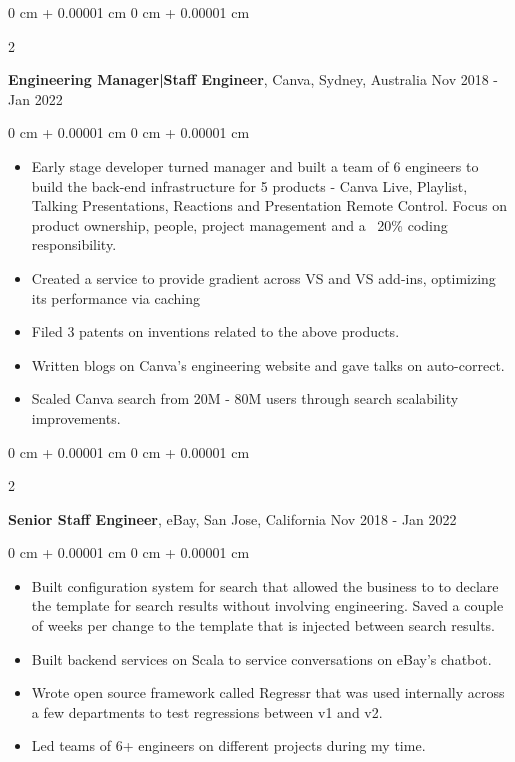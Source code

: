 \documentclass[10pt, letterpaper]{article}
\newenvironment{highlights}{
    \begin{itemize}[
        topsep=0.10 cm,
        parsep=0.10 cm,
        partopsep=0pt,
        itemsep=0pt,
        leftmargin=0 cm + 10pt
    ]
}{
    \end{itemize}
} %
\newenvironment{onecolentry}{
    \begin{adjustwidth}{
        0 cm + 0.00001 cm
    }{
        0 cm + 0.00001 cm
    }
}{
    \end{adjustwidth}
} %
\newenvironment{twocolentry}[2][]{
    \onecolentry
    \def\secondColumn{#2}
    \setcolumnwidth{\fill, 4.5 cm}
    \begin{paracol}{2}
}{
    \switchcolumn \raggedleft \secondColumn
    \end{paracol}
    \endonecolentry
} %
\begin{document}
        \vspace{0.15 cm}

        \begin{twocolentry}{
            Nov 2018 - Jan 2022
        }
            \textbf{Engineering Manager|Staff Engineer}, Canva, Sydney, Australia\end{twocolentry}

        \vspace{0.10 cm}
        \begin{onecolentry}
            \begin{highlights}
                \item Early stage developer turned manager and built a team of 6 engineers to build the back-end infrastructure for 5 products - Canva Live, Playlist, Talking Presentations, Reactions and Presentation Remote Control. Focus on product ownership, people, project management and a ~20\% coding responsibility.
                \item Created a service to provide gradient across VS and VS add-ins, optimizing its performance via caching
                \item Filed 3 patents on inventions related to the above products.
                \item Written blogs on Canva's engineering website and gave talks on auto-correct.
                \item Scaled Canva search from 20M - 80M users through search scalability improvements.
            \end{highlights}
        \end{onecolentry}

        \vspace{0.15 cm}
        \begin{twocolentry}{
            Nov 2018 - Jan 2022
        }
            \textbf{Senior Staff Engineer}, eBay, San Jose, California\end{twocolentry}
        \vspace{0.10 cm}
        \begin{onecolentry}
            \begin{highlights}
                \item Built configuration system for search that allowed the business to to declare the template for search results without involving engineering. Saved a couple of weeks per change to the template that is injected between search results.
                \item Built backend services on Scala to service conversations on eBay’s chatbot.
                \item Wrote open source framework called Regressr that was used internally across a few departments to test regressions between v1 and v2.
                \item Led teams of 6+ engineers on different projects during my time.
            \end{highlights}
        \end{onecolentry}
\end{document}
